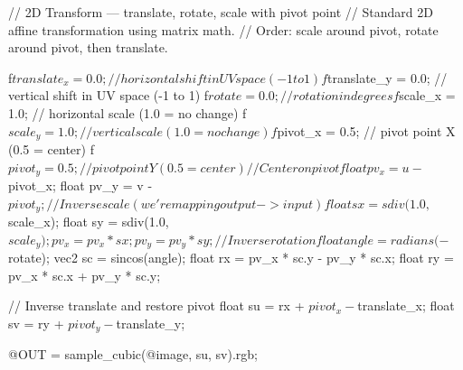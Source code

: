 // 2D Transform — translate, rotate, scale with pivot point
// Standard 2D affine transformation using matrix math.
// Order: scale around pivot, rotate around pivot, then translate.

f$translate_x = 0.0;   // horizontal shift in UV space (-1 to 1)
f$translate_y = 0.0;   // vertical shift in UV space (-1 to 1)
f$rotate = 0.0;        // rotation in degrees
f$scale_x = 1.0;       // horizontal scale (1.0 = no change)
f$scale_y = 1.0;       // vertical scale (1.0 = no change)
f$pivot_x = 0.5;       // pivot point X (0.5 = center)
f$pivot_y = 0.5;       // pivot point Y (0.5 = center)

// Center on pivot
float pv_x = u - $pivot_x;
float pv_y = v - $pivot_y;

// Inverse scale (we're mapping output -> input)
float sx = sdiv(1.0, $scale_x);
float sy = sdiv(1.0, $scale_y);
pv_x = pv_x * sx;
pv_y = pv_y * sy;

// Inverse rotation
float angle = radians(-$rotate);
vec2 sc = sincos(angle);
float rx = pv_x * sc.y - pv_y * sc.x;
float ry = pv_x * sc.x + pv_y * sc.y;

// Inverse translate and restore pivot
float su = rx + $pivot_x - $translate_x;
float sv = ry + $pivot_y - $translate_y;

@OUT = sample_cubic(@image, su, sv).rgb;
